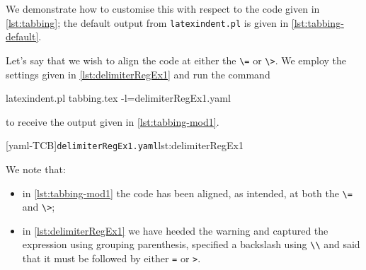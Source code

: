\documentclass[10pt]{article}
\begin{document}
 \begin{example}
 We demonstrate how to customise this with respect to the code given in
 \cref{lst:tabbing}; the default output from \lstinline!latexindent.pl! is given in
 \cref{lst:tabbing-default}.

 \begin{cmhtcbraster}
 \end{cmhtcbraster}

 Let's say that we wish to align the code at either the \lstinline!\=! or \lstinline!\>!.
 We employ the settings given in \cref{lst:delimiterRegEx1} and run the command

 \begin{commandshell}
latexindent.pl tabbing.tex -l=delimiterRegEx1.yaml
\end{commandshell}

 to receive the output given in \cref{lst:tabbing-mod1}. 

 \begin{cmhtcbraster}
  [yaml-TCB]{\texttt{delimiterRegEx1.yaml}}{lst:delimiterRegEx1}
 \end{cmhtcbraster}
 We note that:
 \begin{itemize}
  \item in \cref{lst:tabbing-mod1} the code has been aligned, as intended, at both the
        \lstinline!\=! and \lstinline!\>!;
  \item in \cref{lst:delimiterRegEx1} we have heeded the warning and captured the
        expression using grouping parenthesis, specified a backslash using \lstinline!\\!
        and said that it must be followed by either \lstinline!=! or \lstinline!>!.
 \end{itemize}
 \end{example}
\end{document}
